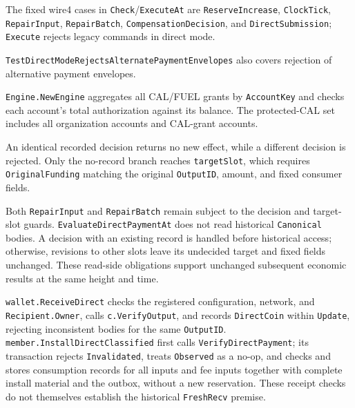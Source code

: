 The fixed wire4 cases in \texttt{Check}/\texttt{ExecuteAt} are
\texttt{ReserveIncrease}, \texttt{ClockTick}, \texttt{RepairInput},
\texttt{RepairBatch}, \texttt{CompensationDecision}, and
\texttt{DirectSubmission}; \texttt{Execute} rejects legacy commands
in direct mode.

\texttt{TestDirectModeRejects\allowbreak AlternatePaymentEnvelopes}
also covers rejection of alternative payment envelopes.


\texttt{Engine.NewEngine} aggregates all CAL/FUEL grants by
\texttt{AccountKey} and checks each account's total authorization
against its balance. The protected-CAL set includes all organization
accounts and CAL-grant accounts.


An identical recorded decision returns no new effect, while a
different decision is rejected. Only the no-record branch reaches
\texttt{targetSlot}, which requires \texttt{OriginalFunding}
matching the original \texttt{OutputID}, amount, and fixed
consumer fields.


Both \texttt{RepairInput} and \texttt{RepairBatch} remain subject
to the decision and target-slot guards.
\texttt{EvaluateDirectPaymentAt} does not read historical
\texttt{Canonical} bodies. A decision with an existing record
is handled before historical access; otherwise, revisions to
other slots leave its undecided target and fixed fields unchanged.
These read-side obligations support unchanged subsequent economic
results at the same height and time.


\texttt{wallet.ReceiveDirect} checks the registered configuration,
network, and \texttt{Recipient.Owner}, calls \texttt{c.VerifyOutput},
and records \texttt{DirectCoin} within \texttt{Update}, rejecting
inconsistent bodies for the same \texttt{OutputID}.
\texttt{member.InstallDirectClassified} first calls
\texttt{VerifyDirectPayment}; its transaction rejects
\texttt{Invalidated}, treats \texttt{Observed} as a no-op, and
checks and stores consumption records for all inputs and fee inputs
together with complete install material and the outbox, without
a new reservation. These receipt checks do not themselves establish
the historical \texttt{FreshRecv} premise.



